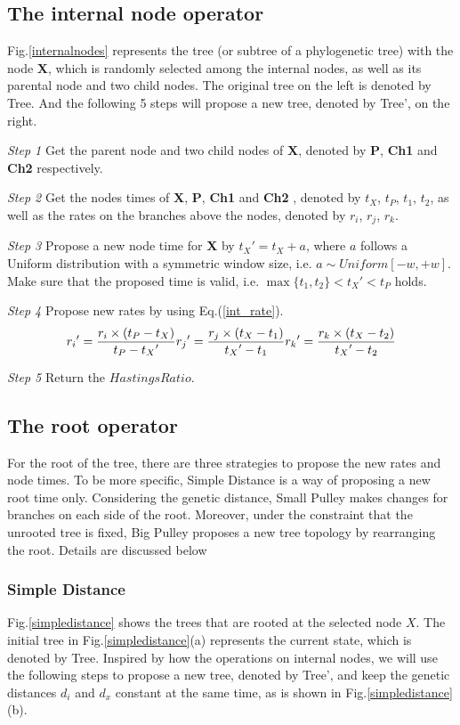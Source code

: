 \documentclass{bmcart}
\begin{document}
\subsection*{The internal node operator}
Fig.\ref{internalnodes} represents the tree (or subtree of a phylogenetic tree) with the node \textbf{X}, which is randomly selected among the internal nodes, as well as its parental node and two child nodes. The original tree on the left is denoted by Tree. And the following 5 steps will propose a new tree, denoted by Tree', on the right.

\emph{Step 1} Get the parent node and two child nodes of \textbf{X}, denoted by \textbf{P}, \textbf{Ch1} and \textbf{Ch2} respectively.

\emph{Step 2} Get the nodes times of \textbf{X}, \textbf{P}, \textbf{Ch1} and \textbf{Ch2} , denoted by $t_X$, $t_P$, $t_1$, $t_2$, as well as the rates on the branches above the nodes, denoted by $r_i$, $r_j$, $r_k$.

\emph{Step 3} Propose a new node time for \textbf{X} by ${t_X}' = {t_X} + a$, where $a$ follows a Uniform distribution with a symmetric window size, i.e. $a \sim Uniform[ - w, + w]$. Make sure that the proposed time is valid, i.e. $\max \{ {t_1},{t_2}\}  < {t_X}' < {t_P}$ holds.

\emph{Step 4} Propose new rates by using Eq.(\ref{int_rate}).
\begin{equation}
 \label{int_rate}
{r_i}' = \frac{{r_i} \times ({{t_P} - {t_X}})}{{{t_P} - {t_X}'}}\\
{r_j}' = \frac{{{r_j} \times ({{t_X} - {t_1}})}}{{{t_X}' - {t_1}}}\\
{r_k}' = \frac{{{r_k} \times ({{t_X} - {t_2}})}}{{{t_X}' - {t_2}}}
 \end{equation}

\emph{Step 5} Return the $HastingsRatio$.

\subsection*{The root operator}
For the root of the tree, there are three strategies to propose the new rates and node times. To be more specific, Simple Distance is a way of proposing a new root time only. Considering the genetic distance, Small Pulley makes changes for branches on each side of the root. Moreover, under the constraint that the unrooted tree is fixed, Big Pulley proposes a new tree topology by rearranging the root.  Details are discussed below
\subsubsection*{Simple Distance}
Fig.\ref{simpledistance} shows the trees that are rooted at the selected node $X$. The initial tree in Fig.\ref{simpledistance}(a) represents the current state, which is denoted by Tree. Inspired by how the operations on internal nodes, we will use the following steps to propose a new tree, denoted by Tree', and keep the genetic distances $d_i$ and $d_x$ constant at the same time, as is shown in Fig.\ref{simpledistance}(b).
\end{document}
